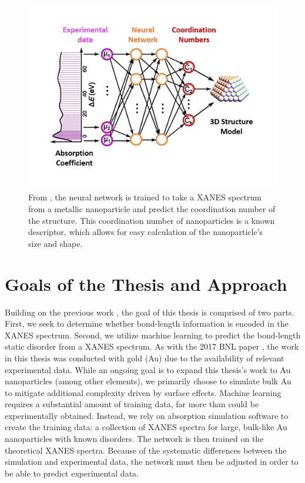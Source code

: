\begin{figure}[h!]
    \centering
    \includegraphics[width=.75\linewidth]{Chapters/Figures/placeholderFrenkel2017.png}
    \caption[ANN for Metallic Nanoparticle Coordination Numbers]{From \cite{Timoshenko2017}, the neural network is trained to take a XANES spectrum from a metallic nanoparticle and predict the coordination number of the structure. This coordination number of nanoparticles is a known descriptor, which allows for easy calculation of the nanoparticle's size and shape.}
\end{figure}

\section{Goals of the Thesis and Approach}
Building on the previous work \cite{Timoshenko2017}, the goal of this thesis is comprised of two parts. First, we seek to determine whether bond-length information is encoded in the XANES spectrum. Second, we utilize machine learning to predict the bond-length static disorder from a XANES spectrum. As with the 2017 BNL paper \cite{Timoshenko2017}, the work in this thesis was conducted with gold (Au) due to the availability of relevant experimental data. While an ongoing goal is to expand this thesis's work to Au nanoparticles (among other elements), we primarily choose to simulate bulk Au to mitigate additional complexity driven by surface effects. Machine learning requires a substantial amount of training data, far more than could be experimentally obtained. Instead, we rely on absorption simulation software to create the training data: a collection of XANES spectra for large, bulk-like Au nanoparticles with known disorders. The network is then trained on the theoretical XANES spectra. Because of the systematic differences between the simulation and experimental data, the network must then be adjusted in order to be able to predict experimental data.

